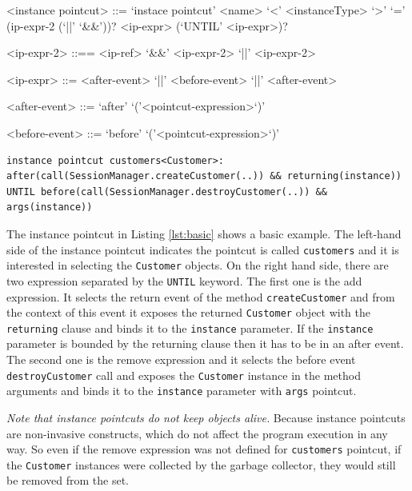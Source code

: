 \documentclass{llncs}
\begin{document}
\begin{grammar}
<instance pointcut> ::= `instace pointcut' <name> `<' <instanceType> `>' `=' (ip-expr-2 (`||' \alt `&&'))? <ip-expr> (`UNTIL' <ip-expr>)? 

<ip-expr-2> ::== <ip-ref>  `&&' <ip-expr-2>  `||' <ip-expr-2>

<ip-expr> ::= <after-event> `||' <before-event>  `||' <after-event>  

<after-event> ::= `after' `('<pointcut-expression>`)'

<before-event> ::= `before' `('<pointcut-expression>`)'
\end{grammar}


\begin{lstlisting}[float=h!, caption={A basic instance pointcut declaration with add and remove expressions}, label={lst:basic}]
instance pointcut customers<Customer>: after(call(SessionManager.createCustomer(..)) && returning(instance)) UNTIL before(call(SessionManager.destroyCustomer(..)) && args(instance))
\end{lstlisting}

The instance pointcut in Listing \ref{lst:basic} shows a basic example. The left-hand side of the instance pointcut indicates the pointcut is called \texttt{customers} and it is interested in selecting the \texttt{Customer} objects. 
On the right hand side, there are two expression separated by the \texttt{UNTIL} keyword. The first one is the add expression. It selects the return event of the method \texttt{createCustomer} and from the context of this event it exposes the returned \texttt{Customer} object with the \texttt{returning} clause and binds it to the \texttt{instance} parameter. If the \texttt{instance} parameter is bounded by the returning clause then it has to be in an after event. The second one is the remove expression and it selects the before event \texttt{destroyCustomer} call and exposes the \texttt{Customer} instance in the method arguments and binds it to the \texttt{instance} parameter with \texttt{args} pointcut.

\emph{Note that instance pointcuts do not keep objects alive.} Because instance pointcuts are non-invasive constructs, which do not affect the program execution in any way. So even if the remove expression was not defined for \texttt{customers} pointcut, if the \texttt{Customer} instances were collected by the garbage collector, they would still be removed from the set. 
\end{document}
